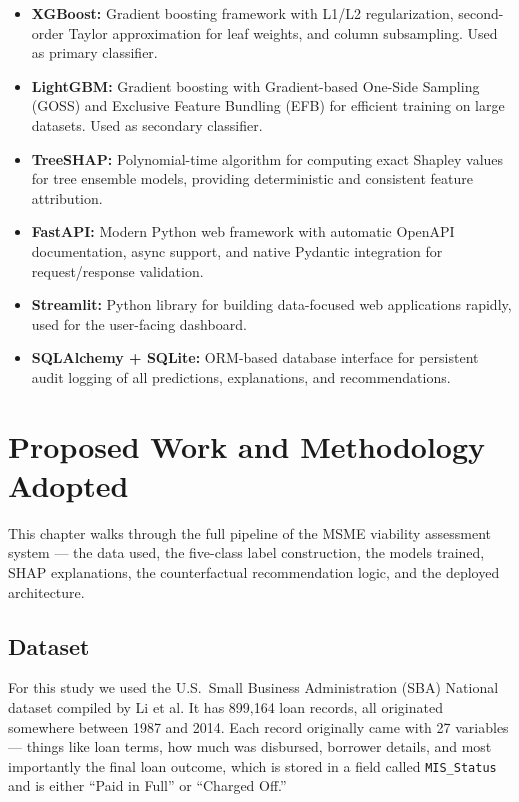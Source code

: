 \documentclass[12pt,a4paper]{report}
\begin{document}
\begin{itemize}
    \item \textbf{XGBoost:} Gradient boosting framework with L1/L2 regularization, second-order Taylor approximation for leaf weights, and column subsampling. Used as primary classifier.

    \item \textbf{LightGBM:} Gradient boosting with Gradient-based One-Side Sampling (GOSS) and Exclusive Feature Bundling (EFB) for efficient training on large datasets. Used as secondary classifier.

    \item \textbf{TreeSHAP:} Polynomial-time algorithm for computing exact Shapley values for tree ensemble models, providing deterministic and consistent feature attribution.

    \item \textbf{FastAPI:} Modern Python web framework with automatic OpenAPI documentation, async support, and native Pydantic integration for request/response validation.

    \item \textbf{Streamlit:} Python library for building data-focused web applications rapidly, used for the user-facing dashboard.

    \item \textbf{SQLAlchemy + SQLite:} ORM-based database interface for persistent audit logging of all predictions, explanations, and recommendations.
\end{itemize}


\chapter{Proposed Work and Methodology Adopted}

This chapter walks through the full pipeline of the MSME viability assessment system --- the data used, the five-class label construction, the models trained, SHAP explanations, the counterfactual recommendation logic, and the deployed architecture.

\section{Dataset}

For this study we used the U.S.\ Small Business Administration (SBA) National dataset compiled by Li et al. It has 899,164 loan records, all originated somewhere between 1987 and 2014. Each record originally came with 27 variables --- things like loan terms, how much was disbursed, borrower details, and most importantly the final loan outcome, which is stored in a field called \texttt{MIS\_Status} and is either ``Paid in Full'' or ``Charged Off.''
\end{document}
